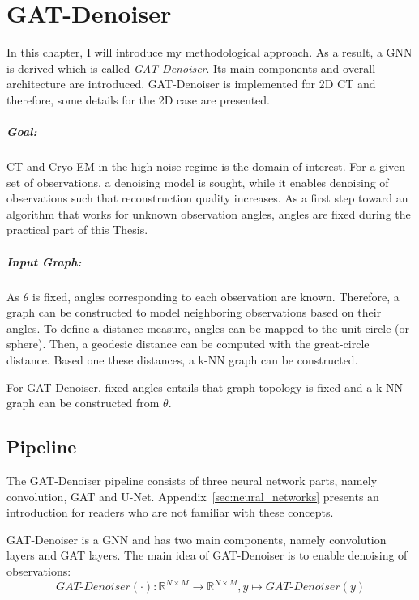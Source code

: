 \chapter{GAT-Denoiser}
\label{sec:contribution}

In this chapter, I will introduce my methodological approach.
As a result, a GNN is derived which is called \textit{GAT-Denoiser}.
Its main components and overall architecture are introduced.
GAT-Denoiser is implemented for 2D CT and therefore, some details for the 2D case are presented.


\paragraph{Goal:}
CT and Cryo-EM in the high-noise regime is the domain of interest.
For a given set of observations, a denoising model is sought, while
it enables denoising of observations such that reconstruction quality increases.
As a first step toward an algorithm that works for unknown observation angles, 
angles are fixed during the practical part of this Thesis.


\paragraph{Input Graph:}
As $\theta$ is fixed, angles corresponding to each observation are known.
Therefore, a graph can be constructed to model neighboring observations 
based on their angles.
To define a distance measure, angles can be mapped to the unit circle (or sphere).
Then, a geodesic distance can be computed with the great-circle distance.
Based one these distances, a k-NN graph can be constructed.


\begin{tcolorbox}[colback=red!5!white,colframe=red!75!black]
  For GAT-Denoiser, fixed angles entails that graph topology is fixed and
  a k-NN graph can be constructed from $\theta$.
\end{tcolorbox}

\section{Pipeline}
\label{sec:concept}
The GAT-Denoiser pipeline consists of three neural network parts, namely convolution, GAT and U-Net.
Appendix~\ref{sec:neural_networks} presents an introduction for readers who are not familiar with these concepts.

GAT-Denoiser is a GNN and has two main components, namely convolution layers and GAT layers.
The main idea of GAT-Denoiser is to enable denoising of observations:
\begin{equation}
  \textit{GAT-Denoiser} (\cdot) : \mathbb{R}^{N \times M} \to  \mathbb{R}^{N \times M} , y \mapsto \textit{GAT-Denoiser} (y) 
\end{equation}


